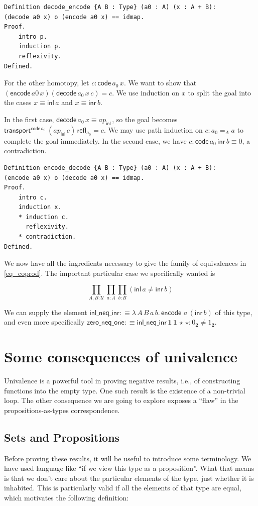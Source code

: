 \documentclass[12 pt]{amsart}
\theoremstyle{definition}
\theoremstyle{remark}
\newcommand{\inl}{\mathsf{inl}\,}
\newcommand{\inr}{\mathsf{inr}\,}
\newcommand{\Type}{\mathcal{U}}
\newcommand{\trans}{\mathsf{transport}}
\newcommand{\refl}{\mathsf{refl}}
\newcommand{\bool}{{\mathbf{2}}}
\newcommand{\boolone}{1_\bool}
\newcommand{\boolzero}{0_\bool}
\newcommand{\one}{{\mathbf{1}}}
\newcommand{\code}{{\mathsf{ code}\,}}
\newcommand{\encode}{{\mathsf{ encode}\,}}
\newcommand{\decode}{{\mathsf{ decode}\,}}
\newcommand{\zeroneqone}{{\mathsf{zero\_neq\_one}}}
\begin{document}
\begin{lstlisting}
Definition decode_encode {A B : Type} (a0 : A) (x : A + B):
(decode a0 x) o (encode a0 x) == idmap.
Proof.
    intro p.
    induction p.
    reflexivity.
Defined.
\end{lstlisting}


For the other homotopy, let $c : \code a_0 \,x$. We want to show that $(\encode a0\,x) (\decode a_0\,x\, c) = c$. We use induction on $x$ to split the goal into the cases $x \equiv \inl a$ and $x \equiv \inr b$. 

In the first case, $\decode a_0\,x \equiv ap_{\inl}$, so the goal becomes $\trans ^{\code a_0} \, (ap_{\inl} c) \, \refl_{a_0} = c$. We may use path induction on $c : a_0 =_A a$ to complete the goal immediately. In the second case, we have $c : \code a_0 \,\inr b \equiv 0$, a contradiction.

\begin{lstlisting}
Definition encode_decode {A B : Type} (a0 : A) (x : A + B): 
(encode a0 x) o (decode a0 x) == idmap.
Proof.
    intro c.
    induction x.
    * induction c.
      reflexivity.
    * contradiction.
Defined.
\end{lstlisting}

We now have all the ingredients necessary to give the family of equivalences in \ref{eq_coprod}. The important particular case we specifically wanted is 

\[\prod_{A ,B : \Type}\prod_{a : A}\prod _{b : B} \left(\inl a \neq \inr b\right)\]

We can supply the element $\mathsf{inl\_neq\_inr}:\equiv \lambda\, A\, B\, a\, b.\, \encode\, a \,(\inr b)$ of this type, and even more specifically $\zeroneqone:\equiv \mathsf{inl\_neq\_inr} \, \one \, \one \, \star \, \star : \boolzero \neq \boolone$.

\section {Some consequences of univalence}
\label{sec:univ}

Univalence is a powerful tool in proving negative results, i.e., of constructing functions into the empty type. One such result is the existence of a non-trivial loop. The other consequence we are going to explore exposes a ``flaw'' in the propositions-as-types correspondence.

\subsection{Sets and Propositions}
Before proving these results, it will be useful to introduce some terminology. We have used language like ``if we view this type as a proposition''. What that means is that we don't care about the particular elements of the type, just whether it is inhabited. This is particularly valid if all the elements of that type are equal, which motivates the following definition:
\end{document}
